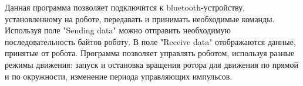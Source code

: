 Данная программа позволяет подключится к bluetooth-устройству, установленному на роботе, передавать и принимать необходимые команды. Используя поле "Sending data" можно отправить необходимую последовательность байтов роботу. В поле "Receive data" отображаются данные, принятые от робота. Программа позволяет управлять роботом, используя разные режимы движения: запуск и остановка вращения ротора для движения по прямой и по окружности, изменение периода управляющих импульсов.


%
%
%


\clearpage